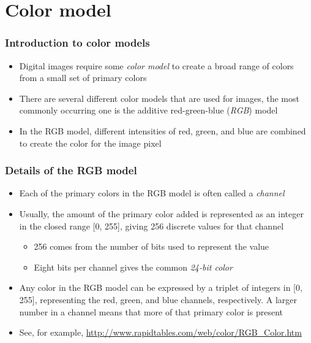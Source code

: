 \documentclass{beamer}
\begin{document}
\section{Color model}

\begin{frame}
	\frametitle{Introduction to color models}

	\begin{itemize}

		\item Digital images require some {\em color model} to create a broad range of colors from a small set of primary colors
		\item There are several different color models that are used for images, the most commonly occurring one is the additive red-green-blue ({\em RGB}) model
		\item In the RGB model, different intensities of red, green, and blue are combined to create the color for the image pixel

	\end{itemize}

\end{frame}

\begin{frame}
	\frametitle{Details of the RGB model}

	\begin{itemize}

		\item Each of the primary colors in the RGB model is often called a {\em channel}

		\item Usually, the amount of the primary color added is represented as an integer in the closed range [0, 255], giving 256 discrete values for that channel

		\begin{itemize}

			\item 256 comes from the number of bits used to represent the value

			\item Eight bits per channel gives the common {\em 24-bit color}

		\end{itemize}

		\item Any color in the RGB model can be expressed by a triplet of integers in [0, 255], representing the red, green, and blue channels, respectively. A larger number in a channel means that more of that primary color is present

		\item See, for example, \url{http://www.rapidtables.com/web/color/RGB_Color.htm}

	\end{itemize}

\end{frame}
\end{document}
